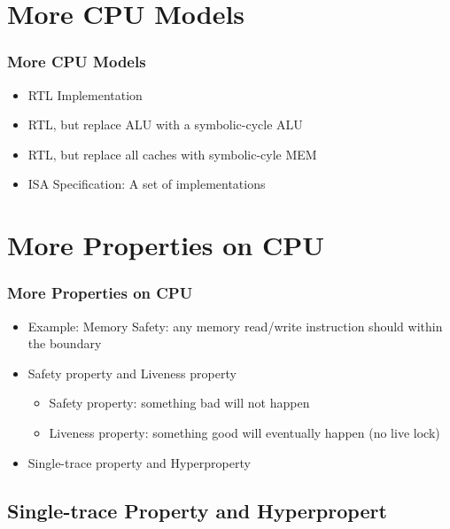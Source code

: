 \documentclass{beamer}
\begin{document}
\section{More CPU Models}

\begin{frame}
\frametitle{More CPU Models}
\begin{itemize}
  \item<1-> RTL Implementation
  \item<2-> RTL, but replace ALU with a symbolic-cycle ALU
  \item<2-> RTL, but replace all caches with symbolic-cyle MEM
  \item<1-> ISA Specification: A set of implementations
\end{itemize}
\end{frame}



\section{More Properties on CPU}

\begin{frame}
\frametitle{More Properties on CPU}
\begin{itemize}
  \item<1-> Example: Memory Safety: any memory read/write instruction should within the boundary
  \item<2-> Safety property and Liveness property
  \begin{itemize}
    \item<3-> Safety property: something bad will not happen
    \item<3-> Liveness property: something good will eventually happen (no live lock)
  \end{itemize}
  \item<4-> Single-trace property and Hyperproperty
\end{itemize}
\end{frame}



\subsection{Single-trace Property and Hyperpropert}
\end{document}
